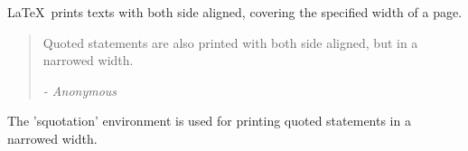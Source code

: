 \LaTeX\ prints texts with both side aligned,
covering the specified width of a page.
\begin{quotation}
\begin{spacing}{1.2}
Quoted statements are also printed with both side
aligned, but in a narrowed width.
\begin{flushright}
{\it - Anonymous}
\end{flushright}
\end{spacing}
\end{quotation}
The 'squotation' environment is used for printing
quoted statements in a narrowed width.
